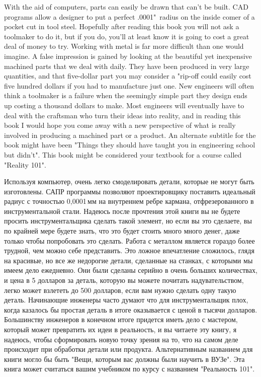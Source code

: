 \begin{enen}
With the aid of computers, parts can easily be drawn that can't be built. CAD
programs allow a designer to put a perfect .0001"\ radius on the inside comer of
a pocket cut in tool steel. Hopefully after reading this book you will not ask a
toolmaker to do it, but if you do, you'll at least know it is going to cost a
great deal of money to try. Working with metal is far more difficult than one
would imagine. A false impression is gained by looking at the beautiful yet
inexpensive machined parts that we deal with daily. They have been produced in
very large quantities, and that five-dollar part you may consider a "rip-off
could easily cost five hundred dollars if you had to manufacture just one. New
engineers will often think a toolmaker is a failure when the seemingly simple
part they design ends up costing a thousand dollars to make. Most engineers will
eventually have to deal with the craftsman who turn their ideas into reality,
and in reading this book I would hope you come away with a new perspective of
what is really involved in producing a machined part or a product. An alternate
subtitle for the book might have been "Things they should have taught you in
engineering school but didn't". This book might be considered your textbook for
a course called "Reality 101".
\end{enen}

\begin{ruru}
Используя компьютер, очень легко смоделировать детали, которые не могут быть
изготовлены. САПР программы позволяют проектировщику поставить идеальный радиус
с точностью 0,0001\,мм на внутреннем ребре кармана, отфрезерованного в
инструментальной стали. Надеюсь после прочтения этой книги вы не будете просить
инструментальщика сделать такой элемент, но если вы это сделаете, вы по крайней
мере будете знать, что это будет стоить много много денег, даже только чтобы
попробовать это сделать. Работа с металлом является гораздо более трудной, чем
можно себе представить. Это ложное впечатление сложилось, глядя на красивые, но
все же недорогие детали, сделанные на станках, с которыми мы имеем дело
ежедневно. Они были сделаны серийно в очень больших количествах, и цена в 5
долларов за деталь, которую вы можете почитать надувательством, легко может
взлететь до 500 долларов, если вам нужно сделать одну такую деталь. Начинающие
инженеры часто думают что для инструментальщик плох, когда казалось бы простая
деталь в итоге оказывается с ценой в тысячи долларов. Большинству инженеров в
конечном итоге придется иметь дело с мастером, который может превратить их идеи
в реальность, и вы читаете эту книгу, я надеюсь, чтобы сформировать новую точку
зрения на то, что на самом деле происходит при обработки детали или продукта.
Альтернативным названием для книги могло бы быть "Вещи, которым вас должны были
научить в ВУЗе". Эта книга может считаться вашим учебником по курсу с названием
"Реальность 101".
\end{ruru}

